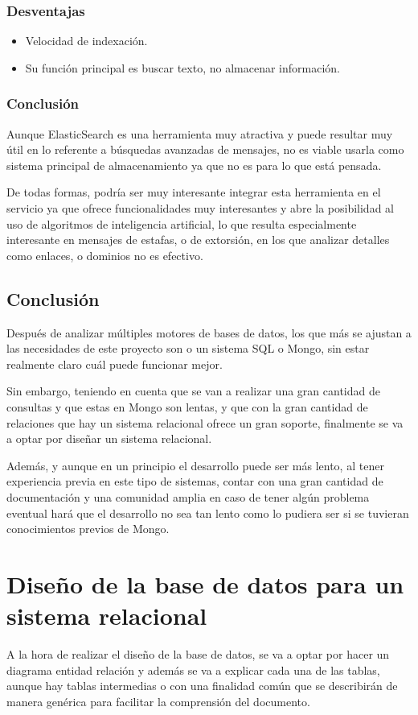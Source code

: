 \subsubsection{Desventajas}
\begin{itemize}
    \item Velocidad de indexación.
    \item Su función principal es buscar texto, no almacenar información.
\end{itemize}
\subsubsection{Conclusión}
Aunque ElasticSearch es una herramienta muy atractiva y puede resultar muy útil en lo referente a búsquedas avanzadas de mensajes, no es viable usarla como sistema principal de almacenamiento ya que no es para lo que está pensada. 

De todas formas, podría ser muy interesante integrar esta herramienta en el servicio ya que ofrece funcionalidades muy interesantes y abre la posibilidad al uso de algoritmos de inteligencia artificial, lo que resulta especialmente interesante en mensajes de estafas, o de extorsión, en los que analizar detalles como enlaces, o dominios no es efectivo. 
\subsection{Conclusión}
Después de analizar múltiples motores de bases de datos, los que más se ajustan a las necesidades de este proyecto son o un sistema SQL o Mongo, sin estar realmente claro cuál puede funcionar mejor. 

Sin embargo, teniendo en cuenta que se van a realizar una gran cantidad de consultas y que estas en Mongo son lentas, y que con la gran cantidad de relaciones que hay un sistema relacional ofrece un gran soporte, finalmente se va a optar por diseñar un sistema relacional.

Además, y aunque en un principio el desarrollo puede ser más lento, al tener experiencia previa en este tipo de sistemas, contar con una gran cantidad de documentación y una comunidad amplia en caso de tener algún problema eventual hará que el desarrollo no sea tan lento como lo pudiera ser si se tuvieran conocimientos previos de Mongo. 


\section{Diseño de la base de datos para un sistema relacional}
A la hora de realizar el diseño de la base de datos, se va a optar por hacer un diagrama entidad relación y además se va a explicar cada una de las tablas, aunque hay tablas intermedias o con una finalidad común que se describirán de manera genérica para facilitar la comprensión del documento. 

